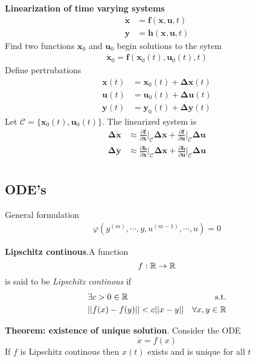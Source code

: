 \textbf{Linearization of time varying systems}
\begin{align*}
    \dot{\bm{x}} &= \bm{f}(\bm{x},\bm{u},t) \\
    \bm{y} &= \bm{h}(\bm{x},\bm{u},t)
\end{align*}
Find two functions \(\bm{x}_0\) and \(\bm{u}_0\) begin solutions to the sytem
\begin{align*}
    \dot{\bm{x}}_0 = \bm{f}(\bm{x}_0(t),\bm{u}_0(t),t)
\end{align*}
Define pertrubations
\begin{align*}
    \bm{x}(t) &= \bm{x}_0(t) + \bm{\Delta x}(t) \\
    \bm{u}(t) &= \bm{u}_0(t) + \bm{\Delta u}(t) \\
    \bm{y}(t) &= \bm{y}_0(t) + \bm{\Delta y}(t)
\end{align*}
Let \(\mathcal{C} = \{\bm{x}_0(t),\bm{u}_0(t)\}\). The linearized system is
\begin{align*}
    \bm{\Delta \dot{x}} &\approx \frac{\partial\bm{f}}{\partial\bm{x}}\Big|_{\mathcal{C}} \bm{\Delta x} +
        \frac{\partial\bm{f}}{\partial\bm{u}}\Big|_{\mathcal{C}}\bm{\Delta u} \\
    \bm{\Delta \dot{y}} &\approx \frac{\partial\bm{h}}{\partial\bm{x}}\Big|_{\mathcal{C}} \bm{\Delta x} +
        \frac{\partial\bm{h}}{\partial\bm{u}}\Big|_{\mathcal{C}}\bm{\Delta u} \\
\end{align*}

\setcounter{subsection}{4}
\subsection{ODE's} %
General formulation
\begin{align*}
    \varphi(y^{(m)},\cdots,y,u^{(m-1)},\cdots,u) = 0
\end{align*}

\textbf{Lipschitz continous}.A function \[f:\mathbb{R} \rightarrow \mathbb{R}\] is said to be \textit{Lipschitz continous} if
\begin{align*}
    &\exists c > 0 \in \mathbb{R} & \textrm{s.t.}\\ &||f(x)-f(y)||<c||x-y|| & \forall x, y \in \mathbb{R}
\end{align*}

\textbf{Theorem: existence of unique solution}. Consider the ODE
\[\dot{x}=f(x)\]
If \(f\) is Lipschitz continous then \(x(t)\) exists and is unique for all \(t\)
\newline

